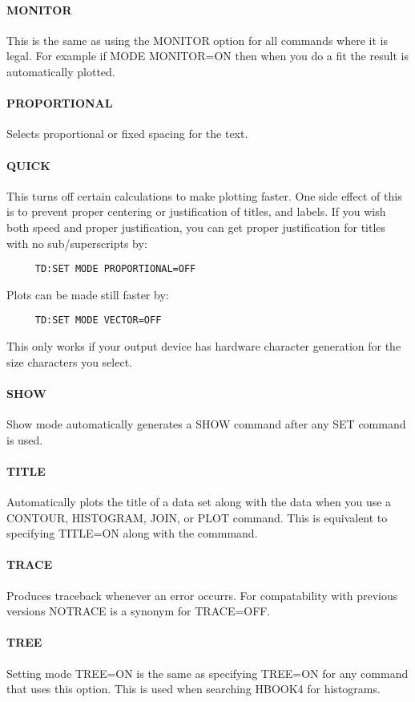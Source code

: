 \paragraph{MONITOR}
This is the same as using the MONITOR option for all commands where
it is legal.  For example if MODE MONITOR=ON then when you do a fit
the result is automatically plotted.  
\paragraph{PROPORTIONAL}
Selects proportional or fixed spacing for the text.  
\paragraph{QUICK}
This turns off certain calculations to make plotting faster.  One
side effect of this is to prevent proper centering or justification
of titles, and labels.  If you wish both speed and proper
justification, you can get proper justification for titles with no
sub/superscripts by:  
\begin{verbatim}
     TD:SET MODE PROPORTIONAL=OFF 
\end{verbatim}
Plots can be made still faster by:  
\begin{verbatim}
     TD:SET MODE VECTOR=OFF 
\end{verbatim}
This only works if your output device has hardware character
generation for the size characters you select.  
\paragraph{SHOW}
Show mode automatically generates a SHOW command after any
SET command is used.  
\paragraph{TITLE}
Automatically plots the title of a data set along with the data when
you use a CONTOUR, HISTOGRAM, JOIN, or PLOT command.  This is
equivalent to specifying TITLE=ON along with the commmand.  
\paragraph{TRACE}
Produces traceback whenever an error occurrs.  For compatability with
previous versions NOTRACE is a synonym for TRACE=OFF.  
\paragraph{TREE}
Setting mode TREE=ON is the same as specifying TREE=ON for any
command that uses this option.  This is used when searching HBOOK4
for histograms.  
